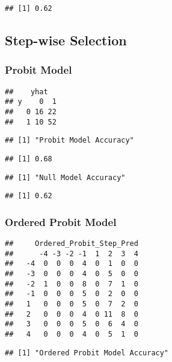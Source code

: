 \documentclass[
]{article}
\begin{document}
\begin{verbatim}
## [1] 0.62
\end{verbatim}

\hypertarget{step-wise-selection-1}{%
\subsection{Step-wise Selection}\label{step-wise-selection-1}}

\hypertarget{probit-model-1}{%
\subsubsection{Probit Model}\label{probit-model-1}}

\begin{verbatim}
##    yhat
## y    0  1
##   0 16 22
##   1 10 52
\end{verbatim}

\begin{verbatim}
## [1] "Probit Model Accuracy"
\end{verbatim}

\begin{verbatim}
## [1] 0.68
\end{verbatim}

\begin{verbatim}
## [1] "Null Model Accuracy"
\end{verbatim}

\begin{verbatim}
## [1] 0.62
\end{verbatim}

\hypertarget{ordered-probit-model-1}{%
\subsubsection{Ordered Probit Model}\label{ordered-probit-model-1}}

\begin{verbatim}
##     Ordered_Probit_Step_Pred
##      -4 -3 -2 -1  1  2  3  4
##   -4  0  0  0  4  0  1  0  0
##   -3  0  0  0  4  0  5  0  0
##   -2  1  0  0  8  0  7  1  0
##   -1  0  0  0  5  0  2  0  0
##   1   0  0  0  5  0  7  2  0
##   2   0  0  0  4  0 11  8  0
##   3   0  0  0  5  0  6  4  0
##   4   0  0  0  4  0  5  1  0
\end{verbatim}

\begin{verbatim}
## [1] "Ordered Probit Model Accuracy"
\end{verbatim}
\end{document}
